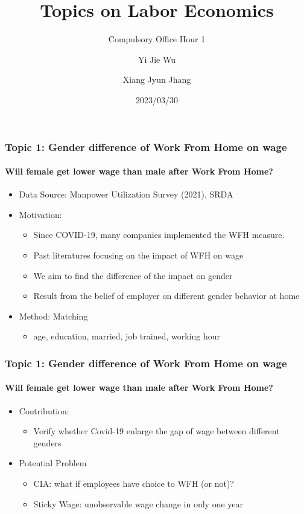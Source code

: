 \documentclass{beamer}
\title{Topics on Labor Economics}
\subtitle{Compulsory Office Hour 1}
\author[Yi Jie Wu, Xiang Jyun Jhang]{Yi Jie Wu\inst{1} \and Xiang Jyun Jhang\inst{2}}
\institute[NTU]
{
    \inst{1}
    Department of Economics \\ 
    National Taiwan University
    \and
    \inst{2}
    Department of Economics \\ 
    National Taiwan University
}
\date{2023/03/30}
\begin{document}
\frame{\titlepage}
\begin{frame} %
\frametitle{Topic 1: Gender difference of Work From Home on wage}
\framesubtitle{Will female get lower wage than male after Work From Home?}
\begin{itemize}
    \item Data Source: Manpower Utilization Survey (2021), SRDA
    \item Motivation: 
    \begin{itemize}
        \item Since COVID-19, many companies implemented the WFH measure.
        \item Past literatures focusing on the impact of WFH on wage
        \item We aim to find the difference of the impact on gender
        \item Result from the belief of employer on different gender behavior at home
    \end{itemize} 
    \item Method: Matching
    \begin{itemize}
        \item age, education, married, job trained, working hour
    \end{itemize}
\end{itemize}
\end{frame}


\begin{frame} %
\frametitle{Topic 1: Gender difference of Work From Home on wage}
\framesubtitle{Will female get lower wage than male after Work From Home?}
\begin{itemize}
    \item Contribution: 
    \begin{itemize}
        \item Verify whether Covid-19 enlarge the gap of wage between different genders
    \end{itemize}
    \item Potential Problem
    \begin{itemize}
        \item CIA: what if employees have choice to WFH (or not)?
        \item Sticky Wage: unobservable wage change in only one year
    \end{itemize}
\end{itemize}
\end{frame}
\end{document}
